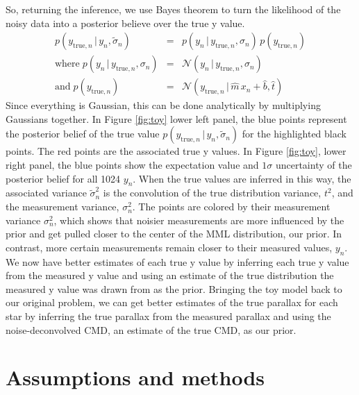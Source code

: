 \documentclass[modern]{aastex61}
\newcommand{\acronym}[1]{{\small{#1}}}
\newcommand{\cmd}{\acronym{CMD}}
\newcommand{\given}{\,|\,}
\newcommand{\true}{\mathrm{true}}
\begin{document}
So, returning the inference, we use Bayes theorem to turn the likelihood of the noisy data into a posterior believe over the true y value.
\begin{eqnarray}
p(y_{\true,n} \given y_n, \tilde{\sigma}_n) &=& p(y_n \given y_{\true,n}, \sigma_n)\,p(y_{\true,n}) \\
\mathrm{where}\;p(y_n \given y_{\true,n}, \sigma_n) &=& \mathcal{N}(y_n \given y_{\true,n}, \sigma_n) \\
\mathrm{and}\;p(y_{\true,n}) &=& \mathcal{N}(y_{\true,n} \given \hat{m}\, x_n + \hat{b}, \hat{t})
\label{eq:toyBayes}
\end{eqnarray}
Since everything is Gaussian, this can be done analytically by multiplying Gaussians together. In Figure \ref{fig:toy} lower left panel, the blue points represent the posterior belief of the true value $p(y_{\true,n} \given y_n, \tilde{\sigma}_n)$ for the highlighted black points. The red points are the associated true y values.
In Figure \ref{fig:toy}, lower right panel, the blue points show the expectation value and $1\sigma$ uncertainty of the posterior belief for all 1024 $y_n$.
When the true values are inferred in this way, the associated variance $\tilde{\sigma}_n^2$ is the convolution of the true distribution variance, $t^2$, and the measurement variance, $\sigma_n^2$.
The points are colored by their measurement variance $\sigma_n^2$, which shows that noisier measurements are more influenced by the prior and get pulled closer to the center of the MML distribution, our prior. In contrast, more certain measurements remain closer to their measured values, $y_n$. We now have better estimates of each true y value by inferring each true y value from the measured y value and using an estimate of the true distribution the measured y value was drawn from as the prior. Bringing the toy model back to our original problem, we can get better estimates of the true parallax for each star by inferring the true parallax from the measured parallax and using the noise-deconvolved \cmd, an estimate of the true \cmd, as our prior.

\section{Assumptions and methods}
\end{document}
